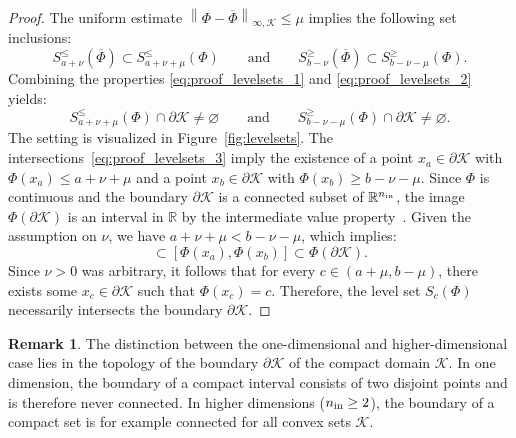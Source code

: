 \documentclass[10pt]{article}
\theoremstyle{definition}
\newtheorem{remark}[theorem]{Remark}
\numberwithin{equation}{section}
\newcommand\norm[1]{\left\lVert#1\right\rVert}
\newcommand{\R}{\mathbb{R}}
\begin{document}
\begin{proof}
    The uniform estimate $\norm{\Phi - \overline{\Phi}}_{\infty,\mathcal{K}} \leq \mu$ implies the following set inclusions:
    \begin{equation}\label{eq:proof_levelsets_2}
        S_{a+\nu}^{\leq}(\overline{\Phi}) \subset S_{a+\nu+\mu}^{\leq}(\Phi) \qquad \text{and} \qquad S_{b-\nu}^{\geq}(\overline{\Phi}) \subset S_{b-\nu-\mu}^{\geq}(\Phi).
    \end{equation}
    Combining the properties \eqref{eq:proof_levelsets_1} and \eqref{eq:proof_levelsets_2} yields:
    \begin{equation}\label{eq:proof_levelsets_3}
        S_{a+\nu+\mu}^{\leq}(\Phi) \cap \partial \mathcal{K} \neq \varnothing \qquad \text{and} \qquad S_{b-\nu-\mu}^{\geq}(\Phi) \cap \partial \mathcal{K} \neq \varnothing.
    \end{equation}
    The setting is visualized in Figure~\ref{fig:levelsets}. The intersections~\eqref{eq:proof_levelsets_3} imply the existence of a point $x_a \in \partial \mathcal{K}$ with $\Phi(x_a) \leq a+\nu+\mu$ and a point $x_b \in \partial \mathcal{K}$ with $\Phi(x_b) \geq b-\nu-\mu$. Since $\Phi$ is continuous and the boundary $\partial \mathcal{K}$ is a connected subset of $\R^{n_{\textup{in}}}$, the image $\Phi(\partial \mathcal{K})$ is an interval in $\R$ by the intermediate value property~\cite[Corollary 22.3]{Ross2013}. 
    Given the assumption on $\nu$, we have $a+\nu+\mu < b-\nu-\mu$, which implies:
    \begin{equation*}
        [a+\nu+\mu, b-\nu-\mu] \subset [\Phi(x_a), \Phi(x_b)] \subset \Phi(\partial \mathcal{K}).
    \end{equation*}
    Since $\nu > 0$ was arbitrary, it follows that for every $c \in (a+\mu, b-\mu)$, there exists some $x_c \in \partial \mathcal{K}$ such that $\Phi(x_c) = c$. Therefore, the level set $S_c(\Phi)$ necessarily intersects the boundary $\partial \mathcal{K}$.
\end{proof}

\begin{remark}
    The distinction between the one-dimensional and higher-dimensional case lies in the topology of the boundary $\partial \mathcal{K}$ of the compact domain $\mathcal{K}$. In one dimension, the boundary of a compact interval consists of two disjoint points and is therefore never connected. In higher dimensions ($n_{\textup{in}} \geq 2$), the boundary of a compact set is for example connected for all convex sets $\mathcal{K}$.
\end{remark}
\end{document}
